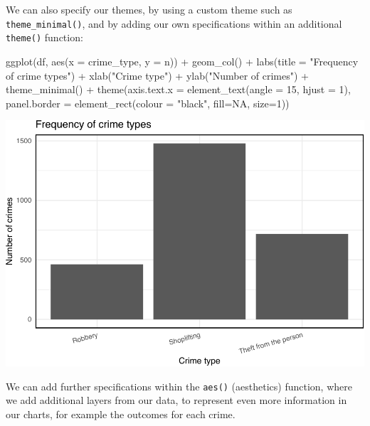\documentclass[
]{book}
\newenvironment{Shaded}{\begin{snugshade}}{\end{snugshade}}
\newcommand{\AttributeTok}[1]{\textcolor[rgb]{0.77,0.63,0.00}{#1}}
\newcommand{\ConstantTok}[1]{\textcolor[rgb]{0.00,0.00,0.00}{#1}}
\newcommand{\DecValTok}[1]{\textcolor[rgb]{0.00,0.00,0.81}{#1}}
\newcommand{\FunctionTok}[1]{\textcolor[rgb]{0.00,0.00,0.00}{#1}}
\newcommand{\NormalTok}[1]{#1}
\newcommand{\SpecialCharTok}[1]{\textcolor[rgb]{0.00,0.00,0.00}{#1}}
\newcommand{\StringTok}[1]{\textcolor[rgb]{0.31,0.60,0.02}{#1}}
\begin{document}
We can also specify our themes, by using a custom theme such as \texttt{theme\_minimal()}, and by adding our own specifications within an additional \texttt{theme()} function:

\begin{Shaded}
\begin{Highlighting}[]
\FunctionTok{ggplot}\NormalTok{(df, }\FunctionTok{aes}\NormalTok{(}\AttributeTok{x =}\NormalTok{ crime\_type, }\AttributeTok{y =}\NormalTok{ n)) }\SpecialCharTok{+} 
  \FunctionTok{geom\_col}\NormalTok{() }\SpecialCharTok{+} 
  \FunctionTok{labs}\NormalTok{(}\AttributeTok{title =} \StringTok{"Frequency of crime types"}\NormalTok{) }\SpecialCharTok{+} 
  \FunctionTok{xlab}\NormalTok{(}\StringTok{"Crime type"}\NormalTok{) }\SpecialCharTok{+} 
  \FunctionTok{ylab}\NormalTok{(}\StringTok{"Number of crimes"}\NormalTok{) }\SpecialCharTok{+} 
  \FunctionTok{theme\_minimal}\NormalTok{() }\SpecialCharTok{+} 
  \FunctionTok{theme}\NormalTok{(}\AttributeTok{axis.text.x =} \FunctionTok{element\_text}\NormalTok{(}\AttributeTok{angle =} \DecValTok{15}\NormalTok{, }\AttributeTok{hjust =} \DecValTok{1}\NormalTok{), }
        \AttributeTok{panel.border =} \FunctionTok{element\_rect}\NormalTok{(}\AttributeTok{colour =} \StringTok{"black"}\NormalTok{, }\AttributeTok{fill=}\ConstantTok{NA}\NormalTok{, }\AttributeTok{size=}\DecValTok{1}\NormalTok{))}
\end{Highlighting}
\end{Shaded}

\includegraphics{crime_mapping_files/figure-latex/unnamed-chunk-11-1.pdf}

We can add further specifications within the \texttt{aes()} (aesthetics) function, where we add additional layers from our data, to represent even more information in our charts, for example the outcomes for each crime.
\end{document}

